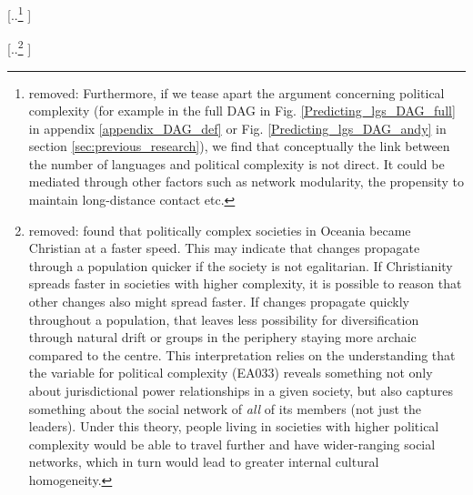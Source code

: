 \documentclass[unnumsec,webpdf,modern,medium]{oup-authoring-template}
\providecommand{\DIFdeltex}[1]{{\protect\color{red} [..\footnote{removed: #1} ]}} %
\providecommand{\DIFdelbegin}{} %
\providecommand{\DIFdel}[1]{\texorpdfstring{\DIFdeltex{#1}}{}} %
\newcommand{\DIFscaledelfig}{0.5}
\newlength{\DIFdelgraphicswidth} %
\newlength{\DIFdelgraphicsheight} %
\newcommand{\DIFdelincludegraphics}[2][]{%
\sbox{\DIFdelgraphicsbox}{\DIFOincludegraphics[#1]{#2}}%
\settoboxwidth{\DIFdelgraphicswidth}{\DIFdelgraphicsbox} %
\settoboxtotalheight{\DIFdelgraphicsheight}{\DIFdelgraphicsbox} %
\scalebox{\DIFscaledelfig}{%
\parbox[b]{\DIFdelgraphicswidth}{\usebox{\DIFdelgraphicsbox}\\[-\baselineskip] \rule{\DIFdelgraphicswidth}{0em}}\llap{\resizebox{\DIFdelgraphicswidth}{\DIFdelgraphicsheight}{%
\setlength{\unitlength}{\DIFdelgraphicswidth}%
\begin{picture}(1,1)%
\thicklines\linethickness{2pt} %
{\color[rgb]{1,0,0}\put(0,0){\framebox(1,1){}}}%
{\color[rgb]{1,0,0}\put(0,0){\line( 1,1){1}}}%
{\color[rgb]{1,0,0}\put(0,1){\line(1,-1){1}}}%
\end{picture}%
}\hspace*{3pt}}} %
} %
\DeclareRobustCommand{\DIFdelbegin}{\DIFOdelbegin \let\includegraphics\DIFdelincludegraphics} %
\begin{document}
\DIFdelbegin \DIFdel{Furthermore, if we tease apart the argument concerning political complexity (for example in the full DAG in Fig. \ref{Predicting_lgs_DAG_full} in appendix \ref{appendix_DAG_def} or Fig. \ref{Predicting_lgs_DAG_andy} in section \ref{sec:previous_research}), we find that conceptually the link between the number of languages and political complexity is not direct. It could be mediated through other factors such as network modularity, the propensity to maintain long-distance contact etc. 
}%

\DIFdel{\citet{watts_2018} found that politically complex societies in Oceania became Christian at a faster speed. This may indicate that changes propagate through a population quicker if the society is not egalitarian. If Christianity spreads faster in societies with higher complexity, it is possible to reason that other changes also might spread faster. If changes propagate quickly throughout a population, that leaves less possibility for diversification through natural drift or groups in the periphery staying more archaic compared to the centre. This interpretation relies on the understanding that the variable for political complexity (EA033) reveals something not only about jurisdictional power relationships in a given society, but also captures something about the social network of \emph{all} of its members (not just the leaders). Under this theory, people living in societies with higher political complexity would be able to travel further and have wider-ranging social networks, which in turn would lead to greater internal cultural homogeneity.
}%
\end{document}
